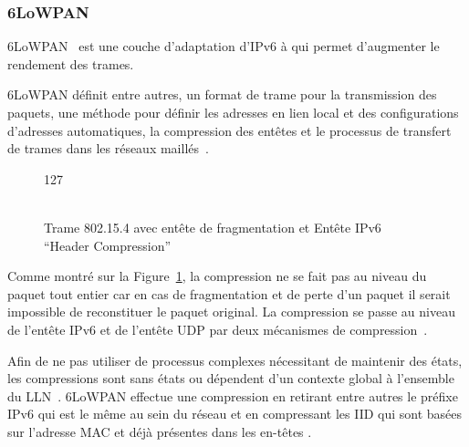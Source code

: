 \subsubsection{6LoWPAN}
\label{gw:6lowpan}

\ac{6LoWPAN}~\cite{rfc4919} est une couche d'adaptation d'IPv6 à \ieee{} qui permet d'augmenter le rendement des trames.

\ac{6LoWPAN} définit entre autres, un format de trame pour la transmission des paquets, une méthode pour définir les adresses en lien local et des configurations d'adresses automatiques, la compression des entêtes et le processus de transfert de trames dans les réseaux maillés~\cite{rfc4944}.

\begin{figure}[ht]
	\centering
	\begin{bytefield}[bitwidth=.007\linewidth]{127}
		 \\
		\\
		\end{bytefield}
	\caption{Trame 802.15.4 avec entête de fragmentation et Entête IPv6 ``Header Compression''}
	\label{gw:fig:headers_6lowpan}
\end{figure}


Comme montré sur la Figure~\ref{gw:fig:headers_6lowpan}, la compression ne se fait pas au niveau du paquet tout entier car en cas de fragmentation et de perte d'un paquet il serait impossible de reconstituer le paquet original.
La compression se passe au niveau de l'entête IPv6 et de l'entête \ac{UDP} par deux mécanismes de compression~\cite{rfc4944}.

Afin de ne pas utiliser de processus complexes nécessitant de maintenir des états, les compressions sont sans états ou dépendent d'un contexte global à l'ensemble du \ac{LLN}~\cite{shelby20116lowpan}.
\ac{6LoWPAN} effectue une compression en retirant entre autres le préfixe IPv6 qui est le même au sein du réseau et en compressant les \ac{IID} qui sont basées sur l'adresse \ac{MAC} et déjà présentes dans les en-têtes \ieee{}.

